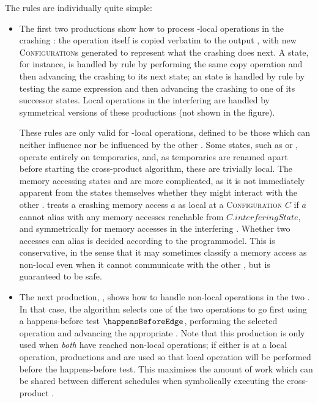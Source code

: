 The rules are individually quite simple:
\begin{itemize}
\item The first two productions show how to process
  {\StateMachine}-local operations in the crashing {\StateMachine}:
  the operation itself is copied verbatim to the output
  {\StateMachine}, with new \textsc{Configuration}s generated to
  represent what the crashing {\StateMachine} does next.  A
   state, for instance, is handled by rule  by
  performing the same copy operation and then advancing the crashing
  {\StateMachine} to its next state; an  state is handled by
  rule  by testing the same expression and then advancing
  the crashing {\StateMachine} to one of its successor states.  Local
  operations in the interfering {\StateMachine} are handled by
  symmetrical versions of these productions (not shown in the figure).

  These rules are only valid for {\StateMachine}-local operations,
  defined to be those which can neither influence nor be influenced by
  the other {\StateMachine}.  Some states, such as  or
  \state{$\Phi$}, operate entirely on {\StateMachine} temporaries,
  and, as temporaries are renamed apart before starting the
  cross-product algorithm, these are trivially local.  The memory
  accessing states  and  are more
  complicated, as it is not immediately apparent from the states
  themselves whether they might interact with the other
  {\StateMachine}.  {\Technique} treats a crashing {\StateMachine}
  memory access $a$ as local at a \textsc{Configuration} $C$ if $a$
  cannot alias with any memory accesses reachable from
  $C.\mathit{interferingState}$, and symmetrically for memory accesses
  in the interfering {\StateMachine}.  Whether two accesses can alias
  is decided according to the \gls{programmodel}.  This is
  conservative, in the sense that it may sometimes classify a memory
  access as non-local even when it cannot communicate with the other
  {\StateMachine}, but is guaranteed to be safe.

\item The next production, , shows how to handle non-local
  operations in the two {\StateMachines}.  In that case, the algorithm
  selects one of the two operations to go first using a happens-before
  test $\happensBeforeEdge$, performing the selected operation and
  advancing the appropriate {\StateMachine}.  Note that this
  production is only used when \emph{both} {\StateMachines} have
  reached non-local operations; if either is at a local operation,
  productions  and  are used so that local
  operation will be performed before the happens-before test.  This
  maximises the amount of work which can be shared between different
  schedules when symbolically executing the cross-product
  {\StateMachine}.


\end{itemize}
